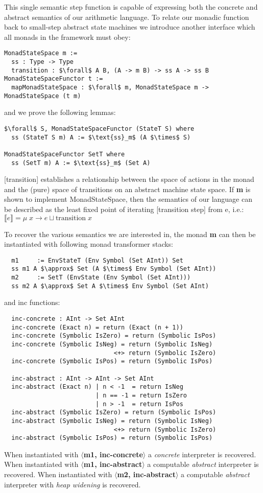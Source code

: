 This single semantic step function is capable of expressing both the concrete
and abstract semantics of our arithmetic language.
%
To relate our monadic function back to small-step abstract state machines we
introduce another interface which all monads in the framework must obey:
%
\begin{lstlisting}
MonadStateSpace m :=
  ss : Type -> Type
  transition : $\forall$ A B, (A -> m B) -> ss A -> ss B
MonadStateSpaceFunctor t :=
  mapMonadStateSpace : $\forall$ m, MonadStateSpace m -> MonadStateSpace (t m)
\end{lstlisting}
%
and we prove the following lemmas:
\begin{lstlisting}
$\forall$ S, MonadStateSpaceFunctor (StateT S) where 
  ss (StateT S m) A := $\text{ss}_m$ (A $\times$ S)

MonadStateSpaceFunctor SetT where
  ss (SetT m) A := $\text{ss}_m$ (Set A)
\end{lstlisting}

[transition] establishes a relationship between the space of actions in the
monad and the (pure) space of transitions on an abstract machine state space.
%
If \textbf{m} is shown to implement MonadStateSpace, then the semantics of our
language can be described as the least fixed point of iterating [transition
step] from e, i.e.:  $\llbracket e \rrbracket = \mu\; x \to e \sqcup
\text{transition}\; x$

To recover the various semantics we are interested in, the monad \textbf{m} can
then be instantiated with following monad transformer stacks:
\begin{lstlisting}
  m1     := EnvStateT (Env Symbol (Set AInt)) Set
  ss m1 A $\approx$ Set (A $\times$ Env Symbol (Set AInt))
  m2     := SetT (EnvState (Env Symbol (Set AInt)))
  ss m2 A $\approx$ Set A $\times$ Env Symbol (Set AInt)
\end{lstlisting}
and inc functions:
\begin{lstlisting}
  inc-concrete : AInt -> Set AInt
  inc-concrete (Exact n) = return (Exact (n + 1))
  inc-concrete (Symbolic IsZero) = return (Symbolic IsPos)
  inc-concrete (Symbolic IsNeg) = return (Symbolic IsNeg) 
                              <+> return (Symbolic IsZero)
  inc-concrete (Symbolic IsPos) = return (Symbolic IsPos)

  inc-abstract : AInt -> AInt -> Set AInt
  inc-abstract (Exact n) | n < -1  = return IsNeg
                         | n == -1 = return IsZero
                         | n > -1  = return IsPos
  inc-abstract (Symbolic IsZero) = return (Symbolic IsPos)
  inc-abstract (Symbolic IsNeg) = return (Symbolic IsNeg) 
                              <+> return (Symbolic IsZero)
  inc-abstract (Symbolic IsPos) = return (Symbolic IsPos)
\end{lstlisting}

When instantiated with \textbf{$\langle$m1, inc-concrete$\rangle$} a
\textit{concrete} interpreter is recovered.  When instantiated with
\textbf{$\langle$m1, inc-abstract$\rangle$} a computable \textit{abstract}
interpreter is recovered.  When instantiated with \textbf{$\langle$m2,
inc-abstract$\rangle$} a computable \textit{abstract} interpreter with
\textit{heap widening} is recovered.


